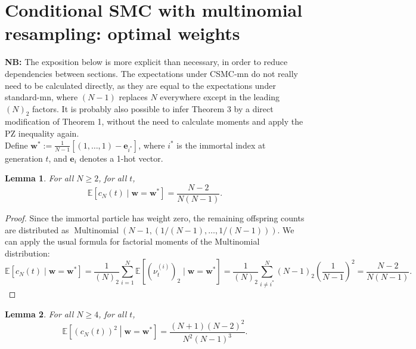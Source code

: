 \documentclass{article}
\newtheorem{lemma}{Lemma}
\newcommand{\E}{\mathbb{E}}
\newcommand{\Mn}{\operatorname{Multinomial}}
\begin{document}
\section*{Conditional SMC with multinomial resampling: optimal weights}
\textbf{NB:} The exposition below is more explicit than necessary, in order to reduce dependencies between sections. The expectations under CSMC-mn do not really need to be calculated directly, as they are equal to the expectations under standard-mn, where $(N-1)$ replaces $N$ everywhere except in the leading $(N)_2$ factors.
It is probably also possible to infer Theorem 3 by a direct modification of Theorem 1, without the need to calculate moments and apply the PZ inequality again.\\

Define $\mathbf{w}^* := \frac{1}{N-1} \left[ (1,\dots,1) - \mathbf{e}_{i^*} \right]$, where $i^*$ is the immortal index at generation $t$, and $\mathbf{e}_i$ denotes a 1-hot vector.
 
\begin{lemma}
For all $N\geq 2$, for all $t$,
\begin{equation*}
\E \left[c_N(t) \mid \mathbf{w}=\mathbf{w}^* \right]
= \frac{N-2}{N(N-1)} .
\end{equation*}
\end{lemma}

\begin{proof}
Since the immortal particle has weight zero, the remaining offspring counts are distributed as $\Mn(N-1, (1/(N-1),\dots,1/(N-1)))$. We can apply the usual formula for factorial moments of the Multinomial distribution:
\begin{equation*}
\E \left[c_N(t) \mid \mathbf{w}=\mathbf{w}^* \right]
= \frac{1}{(N)_2} \sum_{i=1}^N \E \left[(\nu_t^{(i)})_2 \mid \mathbf{w}=\mathbf{w}^* \right]
= \frac{1}{(N)_2} \sum_{i\neq i^*}^N (N-1)_2 \left(\frac{1}{N-1}\right)^2
= \frac{N-2}{N(N-1)}.
\end{equation*}
\end{proof}
 
\begin{lemma}
For all $N\geq 4$, for all $t$,
\begin{equation*}
\E \left[(c_N(t))^2 \middle| \mathbf{w}=\mathbf{w}^* \right]
= \frac{(N+1)(N-2)^2}{N^2(N-1)^3} .
\end{equation*}
\end{lemma}
\end{document}

